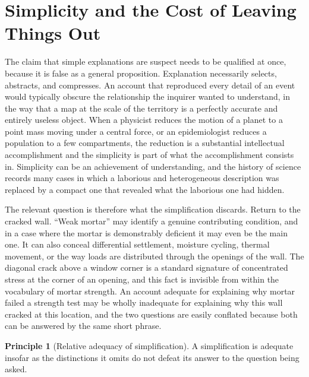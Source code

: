 \documentclass[11pt,letterpaper]{article}
\theoremstyle{definition}
\newtheorem{principle}{Principle}
\begin{document}
\section{Simplicity and the Cost of Leaving Things Out}

The claim that simple explanations are suspect needs to be qualified at once, because it is false as a general proposition. Explanation necessarily selects, abstracts, and compresses. An account that reproduced every detail of an event would typically obscure the relationship the inquirer wanted to understand, in the way that a map at the scale of the territory is a perfectly accurate and entirely useless object. When a physicist reduces the motion of a planet to a point mass moving under a central force, or an epidemiologist reduces a population to a few compartments, the reduction is a substantial intellectual accomplishment and the simplicity is part of what the accomplishment consists in. Simplicity can be an achievement of understanding, and the history of science records many cases in which a laborious and heterogeneous description was replaced by a compact one that revealed what the laborious one had hidden.

The relevant question is therefore what the simplification discards. Return to the cracked wall. ``Weak mortar'' may identify a genuine contributing condition, and in a case where the mortar is demonstrably deficient it may even be the main one. It can also conceal differential settlement, moisture cycling, thermal movement, or the way loads are distributed through the openings of the wall. The diagonal crack above a window corner is a standard signature of concentrated stress at the corner of an opening, and this fact is invisible from within the vocabulary of mortar strength. An account adequate for explaining why mortar failed a strength test may be wholly inadequate for explaining why this wall cracked at this location, and the two questions are easily conflated because both can be answered by the same short phrase.

\begin{principle}[Relative adequacy of simplification]
A simplification is adequate insofar as the distinctions it omits do not defeat its answer to the question being asked.
\end{principle}
\end{document}
